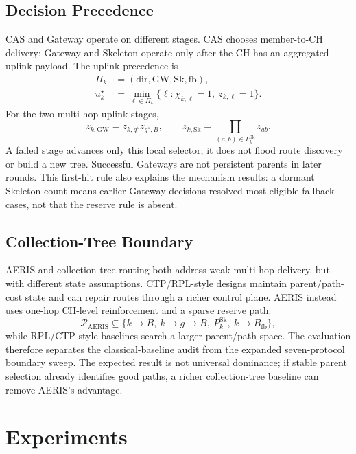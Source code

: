 \documentclass[conference]{IEEEtran}
\begin{document}
\subsection{Decision Precedence}
CAS and Gateway operate on different stages. CAS chooses member-to-CH delivery; Gateway and Skeleton operate only after the CH has an aggregated uplink payload. The uplink precedence is
\begin{equation}
\begin{aligned}
\Pi_k&=(\mathrm{dir},\mathrm{GW},\mathrm{Sk},\mathrm{fb}),\\
u_k^\star&=\min_{\ell\in\Pi_k}\{\ell:\chi_{k,\ell}=1,\ z_{k,\ell}=1\}.
\end{aligned}
\end{equation}
For the two multi-hop uplink stages,
\begin{equation}
z_{k,\mathrm{GW}}=z_{k,g^\star}z_{g^\star,B},\qquad
z_{k,\mathrm{Sk}}=\prod_{(a,b)\in P_k^{\mathrm{Sk}}} z_{ab}.
\end{equation}
A failed stage advances only this local selector; it does not flood route discovery or build a new tree. Successful Gateways are not persistent parents in later rounds. This first-hit rule also explains the mechanism results: a dormant Skeleton count means earlier Gateway decisions resolved most eligible fallback cases, not that the reserve rule is absent.

\subsection{Collection-Tree Boundary}
AERIS and collection-tree routing both address weak multi-hop delivery, but with different state assumptions. CTP/RPL-style designs maintain parent/path-cost state and can repair routes through a richer control plane. AERIS instead uses one-hop CH-level reinforcement and a sparse reserve path:
\begin{equation}
\mathcal{P}_{\mathrm{AERIS}}\subseteq\{k\!\to\!B,\ k\!\to\!g\!\to\!B,\ P_k^{\mathrm{Sk}},\ k\!\to\!B_{\mathrm{fb}}\},
\end{equation}
while RPL/CTP-style baselines search a larger parent/path space. The evaluation therefore separates the classical-baseline audit from the expanded seven-protocol boundary sweep. The expected result is not universal dominance; if stable parent selection already identifies good paths, a richer collection-tree baseline can remove AERIS's advantage.

\section{Experiments}
\end{document}
